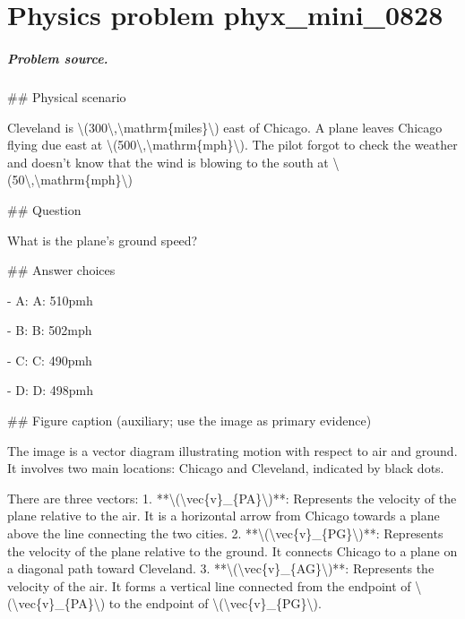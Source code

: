 
\chapter{Physics problem phyx\_mini\_0828}
\label{ch:PhyXMiniProblems_problem_phyx_mini_0828}

\paragraph{Problem source.}
\#\# Physical scenario

Cleveland is \textbackslash{}(300\textbackslash{},\textbackslash{}mathrm\{miles\}\textbackslash{}) east of Chicago. A plane leaves Chicago flying due east at \textbackslash{}(500\textbackslash{},\textbackslash{}mathrm\{mph\}\textbackslash{}). The pilot forgot to check the weather and doesn't know that the wind is blowing to the south at \textbackslash{}(50\textbackslash{},\textbackslash{}mathrm\{mph\}\textbackslash{})

\#\# Question

What is the plane's ground speed?

\#\# Answer choices

- A: A: 510pmh

- B: B: 502mph

- C: C: 490pmh

- D: D: 498pmh

\#\# Figure caption (auxiliary; use the image as primary evidence)

The image is a vector diagram illustrating motion with respect to air and ground. It involves two main locations: Chicago and Cleveland, indicated by black dots.

There are three vectors:
1. **\textbackslash{}(\textbackslash{}vec\{v\}\_\{PA\}\textbackslash{})**: Represents the velocity of the plane relative to the air. It is a horizontal arrow from Chicago towards a plane above the line connecting the two cities.
2. **\textbackslash{}(\textbackslash{}vec\{v\}\_\{PG\}\textbackslash{})**: Represents the velocity of the plane relative to the ground. It connects Chicago to a plane on a diagonal path toward Cleveland.
3. **\textbackslash{}(\textbackslash{}vec\{v\}\_\{AG\}\textbackslash{})**: Represents the velocity of the air. It forms a vertical line connected from the endpoint of \textbackslash{}(\textbackslash{}vec\{v\}\_\{PA\}\textbackslash{}) to the endpoint of \textbackslash{}(\textbackslash{}vec\{v\}\_\{PG\}\textbackslash{}).

